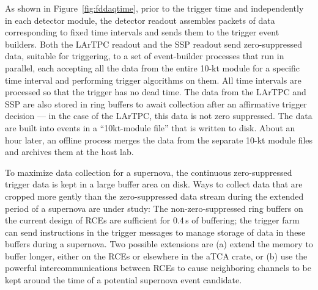 As shown in Figure~\ref{fig:fddaqtime}, prior to the trigger time and
independently in each detector module, the detector readout assembles
packets of data corresponding to fixed time intervals and sends them
to the trigger event builders.  Both the LArTPC readout and the SSP
readout send zero-suppressed data, suitable for triggering, to a set
of event-builder processes that run in parallel, each accepting all
the data from the entire 10-kt module for a specific time interval and
performing trigger algorithms on them.  All time intervals are
processed so that the trigger has no dead time.  The data from the LArTPC and SSP
are also stored in ring buffers
  to await collection after an
affirmative trigger decision --- in the case of the LArTPC, this data
is not zero suppressed.  The data are built into events in a ``10kt-module
file'' that is written to disk.  About an hour later, an offline process merges
the data from the separate 10-kt module files and archives them at the host lab.

To maximize data collection for a supernova, the continuous
zero-suppressed trigger data is kept in a large buffer area on disk.
Ways to collect data that are cropped more gently than the zero-suppressed 
data stream during the extended period of a supernova are
under study: The non-zero-suppressed ring buffers on the current
design of RCEs are
sufficient for 0.4\,s of buffering; the trigger farm can send
instructions in the trigger messages to manage storage of data in
these buffers during a supernova. Two possible extensions
are (a) extend the memory to buffer longer, either on the RCEs or
elsewhere in the aTCA crate, or (b) use the powerful intercommunications between
RCEs to cause neighboring channels to be kept around the time of a
potential supernova event candidate. 


